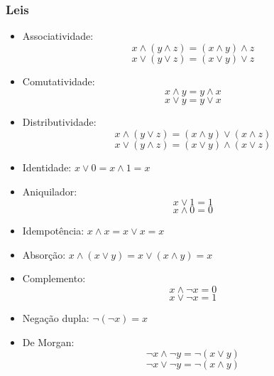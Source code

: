 \subsubsection{Leis}
\begin{multicols}{2}
    \begin{itemize}
        \item Associatividade:
        $$x\land(y \land z) = (x\land y) \land z $$$$ x\lor(y \lor z) = (x\lor y) \lor z$$
        \item Comutatividade:
        $$x\land y = y \land x $$ $$x\lor y = y \lor x$$
        \item Distributividade:
        $$x\land(y \lor z) = (x\land y) \lor (x \land z) $$$$ x\lor(y \land z) = (x\lor y) \land (x \lor z)$$
        \item Identidade: $x\lor 0 = x\land1=x$
        \item Aniquilador: $$x\lor 1 = 1 $$$$ x\land 0 =0$$
        \item Idempotência: $x\land x = x\lor x = x$
        \item Absorção: $x\land(x\lor y) = x \lor(x \land y) = x$    
        \item Complemento: $$x\land \neg x = 0 $$$$ x \lor \neg x = 1$$
        \item Negação dupla: $\neg(\neg x)=x$
        \item De Morgan: $$\neg x \land \neg y = \neg(x \lor y) $$$$ \neg x \lor \neg y = \neg(x \land y)$$
    \end{itemize}
    
\end{multicols}
